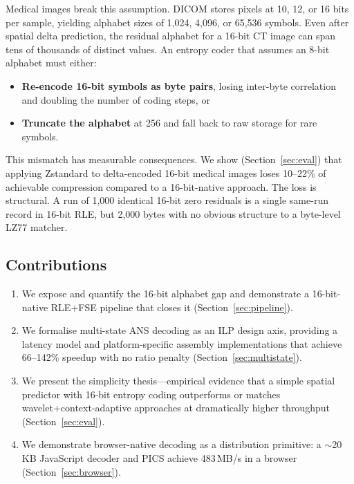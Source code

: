 \documentclass[journal]{IEEEtran}
\begin{document}
Medical images break this assumption. DICOM stores pixels at 10, 12, or 16 bits
per sample, yielding alphabet sizes of 1,024, 4,096, or 65,536 symbols. Even
after spatial delta prediction, the residual alphabet for a 16-bit CT image can
span tens of thousands of distinct values. An entropy coder that assumes an
8-bit alphabet must either:
\begin{itemize}
  \item \textbf{Re-encode 16-bit symbols as byte pairs}, losing inter-byte
  correlation and doubling the number of coding steps, or
  \item \textbf{Truncate the alphabet} at 256 and fall back to raw storage for
  rare symbols.
\end{itemize}

This mismatch has measurable consequences. We show (Section~\ref{sec:eval}) that
applying Zstandard to delta-encoded 16-bit medical images loses 10--22\% of
achievable compression compared to a 16-bit-native approach. The loss is
structural. A run of 1,000 identical 16-bit zero residuals is a single same-run
record in 16-bit RLE, but 2,000 bytes with no obvious structure to a byte-level
LZ77 matcher.

\subsection*{Contributions}

\begin{enumerate}
  \item We expose and quantify the 16-bit alphabet gap and demonstrate a
  16-bit-native RLE+FSE pipeline that closes it (Section~\ref{sec:pipeline}).
  \item We formalise multi-state ANS decoding as an ILP design axis, providing a
  latency model and platform-specific assembly implementations that achieve
  66--142\% speedup with no ratio penalty (Section~\ref{sec:multistate}).
  \item We present the simplicity thesis---empirical evidence that a simple
  spatial predictor with 16-bit entropy coding outperforms or matches
  wavelet+context-adaptive approaches at dramatically higher throughput
  (Section~\ref{sec:eval}).
  \item We demonstrate browser-native decoding as a distribution primitive: a
  $\sim$20\,KB JavaScript decoder and PICS achieve 483\,MB/s in a browser
  (Section~\ref{sec:browser}).
\end{enumerate}
\end{document}
